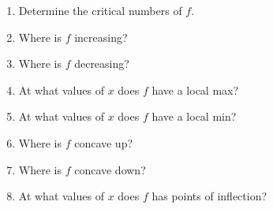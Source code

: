 \documentclass[
]{article}
\begin{document}
\begin{enumerate}
\def\labelenumi{(\alph{enumi})}
\item
  Determine the critical numbers of \(f\).
\item
  Where is \(f\) increasing?
\item
  Where is \(f\) decreasing?
\item
  At what values of \(x\) does \(f\) have a local max?
\item
  At what values of \(x\) does \(f\) have a local min?
\item
  Where is \(f\) concave up?
\item
  Where is \(f\) concave down?
\item
  At what values of \(x\) does \(f\) has points of inflection?
\end{enumerate}
\end{document}
